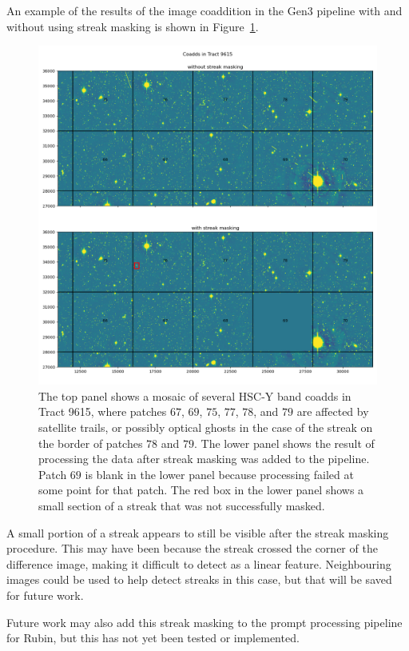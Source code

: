 \documentclass[DM,authoryear,toc]{lsstdoc}
\begin{document}
An example of the results of the image coaddition in the Gen3 pipeline with and without using streak masking is shown in Figure~\ref{fig: pipeline demo}.
\begin{figure}
\includegraphics[width=\columnwidth]{figures/streakMasking_tractdemo_gen3.png}
\caption{The top panel shows a mosaic of several HSC-Y band coadds in Tract 9615, where patches $67$, $69$, $75$, $77$, $78$, and $79$ are affected by satellite trails, or possibly optical ghosts in the case of the streak on the border of patches $78$ and $79$. The lower panel shows the result of processing the data after streak masking was added to the pipeline. Patch $69$ is blank in the lower panel because processing failed at some point for that patch. The red box in the lower panel shows a small section of a streak that was not successfully masked.}
\label{fig: pipeline demo}
\end{figure}
A small portion of a streak appears to still be visible after the streak masking procedure. This may have been because the streak crossed the corner of the difference image, making it difficult to detect as a linear feature. Neighbouring images could be used to help detect streaks in this case, but that will be saved for future work.

Future work may also add this streak masking to the prompt processing pipeline for Rubin, but this has not yet been tested or implemented.
\end{document}
